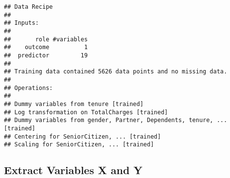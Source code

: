 \documentclass[]{article}
\newenvironment{Shaded}{\begin{snugshade}}{\end{snugshade}}
\newcommand{\KeywordTok}[1]{\textcolor[rgb]{0.13,0.29,0.53}{\textbf{#1}}}
\newcommand{\DataTypeTok}[1]{\textcolor[rgb]{0.13,0.29,0.53}{#1}}
\newcommand{\StringTok}[1]{\textcolor[rgb]{0.31,0.60,0.02}{#1}}
\newcommand{\CommentTok}[1]{\textcolor[rgb]{0.56,0.35,0.01}{\textit{#1}}}
\newcommand{\OperatorTok}[1]{\textcolor[rgb]{0.81,0.36,0.00}{\textbf{#1}}}
\newcommand{\NormalTok}[1]{#1}
\begin{document}
\begin{verbatim}
## Data Recipe
## 
## Inputs:
## 
##       role #variables
##    outcome          1
##  predictor         19
## 
## Training data contained 5626 data points and no missing data.
## 
## Operations:
## 
## Dummy variables from tenure [trained]
## Log transformation on TotalCharges [trained]
## Dummy variables from gender, Partner, Dependents, tenure, ... [trained]
## Centering for SeniorCitizen, ... [trained]
## Scaling for SeniorCitizen, ... [trained]
\end{verbatim}

\subsection{Extract Variables X and Y}\label{extract-variables-x-and-y}

\begin{Shaded}
\end{Shaded}
\end{document}
